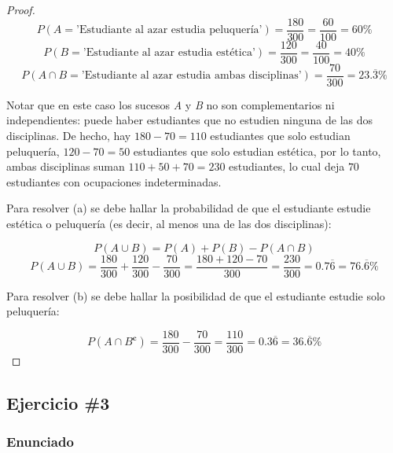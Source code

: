 \documentclass[12pt,a4paper]{article}
\begin{document}
\begin{proof}

  \begin{equation*}
    P(A = \text{'Estudiante al azar estudia peluquería'})=\frac{180}{300}=\frac{60}{100}=60\%
  \end{equation*}
  \begin{equation*}
    P(B = \text{'Estudiante al azar estudia estética'})=\frac{120}{300}=\frac{40}{100}=40\%
  \end{equation*}
  \begin{equation*}
    P(A\cap B = \text{'Estudiante al azar estudia ambas disciplinas'})=\frac{70}{300}=23.\overline{3}\%
  \end{equation*}

  Notar que en este caso los sucesos \textit{A} y \textit{B} no son complementarios ni independientes: puede haber estudiantes que no estudien ninguna de las dos disciplinas. De hecho, hay \(180-70=110\) estudiantes que solo estudian peluquería, \(120-70=50\) estudiantes que solo estudian estética, por lo tanto, ambas disciplinas suman \(110+50+70=230\) estudiantes, lo cual deja \(70\) estudiantes con ocupaciones indeterminadas.

  Para resolver (a) se debe hallar la probabilidad de que el estudiante estudie estética o peluquería (es decir, al menos una de las dos disciplinas):

  \begin{equation*}
    P(A\cup B)=P(A)+P(B)-P(A\cap B)
  \end{equation*}
  \begin{equation*}
    P(A\cup B)=\frac{180}{300}+\frac{120}{300}-\frac{70}{300}=\frac{180+120-70}{300}=\frac{230}{300}=0.7\overline{6}=76.\overline{6}\%
  \end{equation*}

  Para resolver (b) se debe hallar la posibilidad de que el estudiante estudie solo peluquería:

  \begin{equation*}
    P(A\cap B^{\textbf{c}})=\frac{180}{300}-\frac{70}{300}=\frac{110}{300}=0.3\overline{6}=36.\overline{6}\%
  \end{equation*}
\end{proof}

\subsection{Ejercicio \#3}

\subsubsection{Enunciado}
\end{document}
